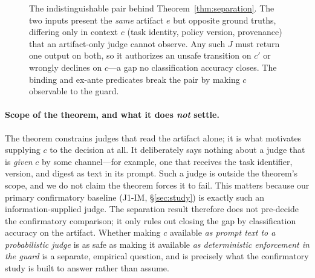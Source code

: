 \documentclass[sigconf,anonymous,review]{acmart}
\begin{document}
\begin{figure}[t]
\centering
{}
\caption{The indistinguishable pair behind Theorem~\ref{thm:separation}. The two inputs present the \emph{same} artifact $e$ but opposite ground truths, differing only in context $c$ (task identity, policy version, provenance) that an artifact-only judge cannot observe. Any such $J$ must return one output on both, so it authorizes an unsafe transition on $c'$ or wrongly declines on $c$---a gap no classification accuracy closes. The binding and ex-ante predicates break the pair by making $c$ observable to the guard.}
\label{fig:indist}
\end{figure}

\paragraph{Scope of the theorem, and what it does \emph{not} settle.} The theorem constrains judges that read the artifact alone; it is what motivates supplying $c$ to the decision at all. It deliberately says nothing about a judge that is \emph{given} $c$ by some channel---for example, one that receives the task identifier, version, and digest as text in its prompt. Such a judge is outside the theorem's scope, and we do not claim the theorem forces it to fail. This matters because our primary confirmatory baseline (J1-IM, \S\ref{sec:study}) is exactly such an information-supplied judge. The separation result therefore does not pre-decide the confirmatory comparison; it only rules out closing the gap by classification accuracy on the artifact. Whether making $c$ available \emph{as prompt text to a probabilistic judge} is as safe as making it available \emph{as deterministic enforcement in the guard} is a separate, empirical question, and is precisely what the confirmatory study is built to answer rather than assume.
\end{document}
